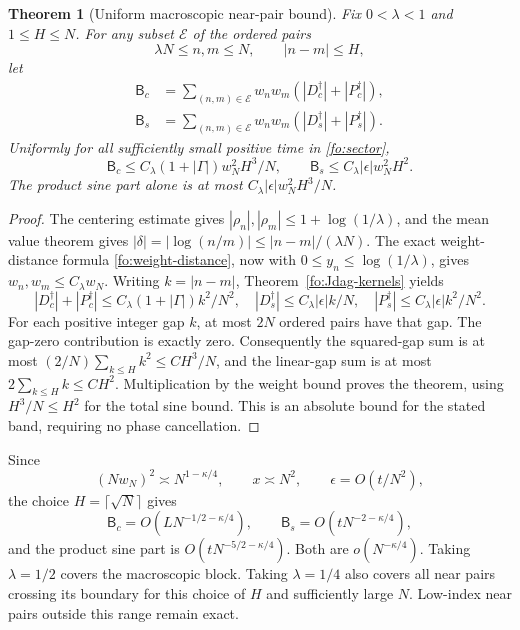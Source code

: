 \documentclass[11pt]{article}
\numberwithin{equation}{section}
\newtheorem{theorem}{Theorem}[section]
\theoremstyle{definition}
\theoremstyle{remark}
\begin{document}
\begin{theorem}[Uniform macroscopic near-pair bound]
\label{fo:near-pair}
Fix $0<\lambda<1$ and $1\le H\le N$.  For any subset $\mathcal E$
of the ordered pairs
\begin{equation}
\lambda N\le n,m\le N,\qquad |n-m|\le H,
\end{equation}
let
\begin{align}
\mathsf B_c&=\sum_{(n,m)\in\mathcal E}w_nw_m
                   (|D_c^\dagger|+|P_c^\dagger|),\nonumber\\
\mathsf B_s&=\sum_{(n,m)\in\mathcal E}w_nw_m
                   (|D_s^\dagger|+|P_s^\dagger|).
\end{align}
Uniformly for all sufficiently small positive time in
\eqref{fo:sector},
\begin{equation}
\mathsf B_c\le C_\lambda(1+|\Gamma|)w_N^2H^3/N,
\qquad
\mathsf B_s\le C_\lambda|\epsilon|w_N^2H^2.
\label{fo:near-pair-bounds}
\end{equation}
The product sine part alone is at most
$C_\lambda|\epsilon|w_N^2H^3/N$.
\end{theorem}
\begin{proof}
The centering estimate gives $|\rho_n|,|\rho_m|\le
1+\log(1/\lambda)$, and the mean value theorem gives
$|\delta|=|\log(n/m)|\le|n-m|/(\lambda N)$.
The exact weight-distance formula \eqref{fo:weight-distance}, now with
$0\le y_n\le\log(1/\lambda)$, gives $w_n,w_m\le C_\lambda w_N$.
Writing $k=|n-m|$, Theorem~\ref{fo:Jdag-kernels} yields
\begin{equation}
|D_c^\dagger|+|P_c^\dagger|
 \le C_\lambda(1+|\Gamma|)k^2/N^2,
\quad |D_s^\dagger|\le C_\lambda|\epsilon|k/N,
\quad |P_s^\dagger|\le C_\lambda|\epsilon|k^2/N^2.
\end{equation}
For each positive integer gap $k$, at most $2N$ ordered pairs have
that gap.  The gap-zero contribution is exactly zero.  Consequently
the squared-gap sum is at most
$(2/N)\sum_{k\le H}k^2\le CH^3/N$, and the linear-gap sum is at
most $2\sum_{k\le H}k\le CH^2$.  Multiplication by the weight
bound proves the theorem, using $H^3/N\le H^2$ for the total sine
bound.  This is an absolute bound for the stated band, requiring no
phase cancellation.
\end{proof}
Since
\begin{equation}
(Nw_N)^2\asymp N^{1-\kappa/4},\qquad x\asymp N^2,
\qquad \epsilon=O(t/N^2),
\end{equation}
the choice $H=\lceil\sqrt N\rceil$ gives
\begin{equation}
\mathsf B_c=O(LN^{-1/2-\kappa/4}),\qquad
\mathsf B_s=O(tN^{-2-\kappa/4}),
\label{fo:near-pair-scales}
\end{equation}
and the product sine part is $O(tN^{-5/2-\kappa/4})$.
Both are $o(N^{-\kappa/4})$.  Taking $\lambda=1/2$ covers the
macroscopic block.  Taking $\lambda=1/4$ also covers all near pairs
crossing its boundary for this choice of $H$ and sufficiently large
$N$.  Low-index near pairs outside this range remain exact.
\end{document}
